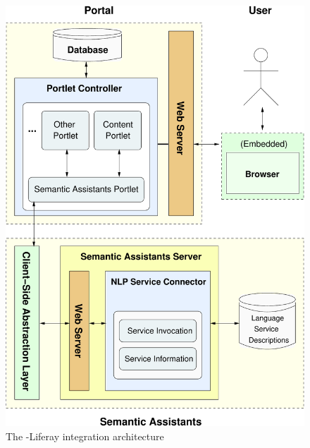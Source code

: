 \begin{figure}[h]
\centering
\includegraphics[scale=0.33]{pictures/liferay_arch.pdf}
\caption{The \sa-Liferay integration architecture}
\label{fig:liferay_arch}
\end{figure}

